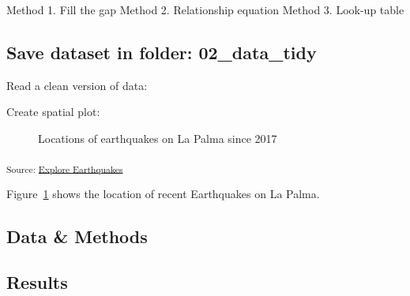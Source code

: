 \documentclass[
]{agujournal2019}
\begin{document}
Method 1. Fill the gap Method 2. Relationship equation Method 3. Look-up
table

\subsection{Save dataset in folder:
02\_data\_tidy}\label{save-dataset-in-folder-02_data_tidy}

Read a clean version of data:

Create spatial plot:

\begin{figure}[H]


\caption{\label{fig-spatial-plot}Locations of earthquakes on La Palma
since 2017}

\end{figure}%

\textsubscript{Source:
\href{https://EmouAcademy.github.io/my-awesome-manuscripts/notebooks/01-earthquakes-preview.html\#00f7f955-6d2f-4f9e-9800-046271588514}{Explore
Earthquakes}}

Figure~\ref{fig-spatial-plot} shows the location of recent Earthquakes
on La Palma.

\subsection{Data \& Methods}\label{sec-data-methods}

\subsection{Results}\label{sec-results}
\end{document}

